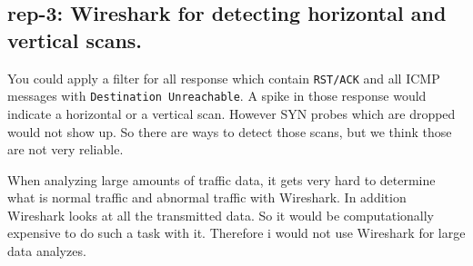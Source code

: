 \subsection*{rep-3: Wireshark for detecting horizontal and vertical scans.}
You could apply a filter for all response which contain \texttt{RST/ACK} and all ICMP messages with \texttt{Destination Unreachable}. A spike in those response would indicate a horizontal or a vertical scan. However SYN probes which are dropped would not show up. So there are ways to detect those scans, but we think those are not very reliable.

When analyzing large amounts of traffic data, it gets very hard to determine what is normal traffic and abnormal traffic with Wireshark. In addition Wireshark looks at all the transmitted data. So it would be computationally expensive to do such a task with it. Therefore i would not use Wireshark for large data analyzes.